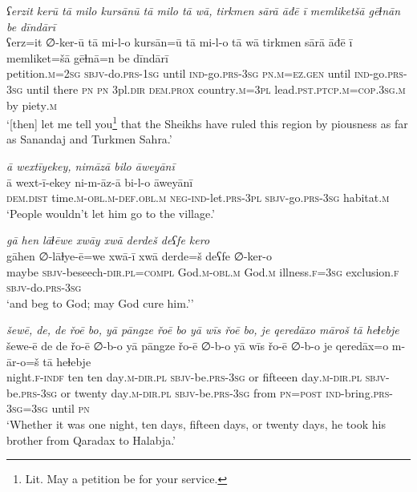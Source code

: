 \ea \label{DG.10}
\textit{ʕerzit kerū tā milo kursānū tā milo tā wā, tirkmen sārā āđē ī memliketšā gēɫnān be dīndārī} \\ 
\gll ʕerz=it ∅-ker-ū tā mi-l-o kursān=ū tā mi-l-o tā wā tirkmen sārā āđē ī memliket=šā gēɫnā=n be dīndārī \\ 
 petition\textsc{.m}\textsc{=\textsc{2sg}} \textsc{sbjv-}do\textsc{.prs}\textsc{-1sg} until \textsc{ind-}go\textsc{.prs}\textsc{-3sg} \textsc{pn}\textsc{.m}\textsc{=ez}\textsc{.gen} until \textsc{ind-}go\textsc{.prs}\textsc{-3sg} until there \textsc{pn} \textsc{pn} 3pl\textsc{.dir} \textsc{dem.prox} country\textsc{.m}\textsc{=3pl} lead\textsc{.pst}\textsc{.ptcp}\textsc{.m}\textsc{=cop}\textsc{.3sg}\textsc{.m} by piety\textsc{.m} \\ 
\glt `[then] let me tell you\footnote{Lit. May a petition be for your service.} that the Sheikhs have ruled this region by piousness as far as Sanandaj and Turkmen Sahra.'
\z 
 
\ea \label{DG.23}
\textit{ā wextīyekey, nimāzā bilo āweyānī} \\ 
\gll ā wext-ī-ekey ni-m-āz-ā bi-l-o āweyānī \\ 
 \textsc{dem.dist} time\textsc{.m}\textsc{-obl}\textsc{.m}\textsc{-def}\textsc{.obl}\textsc{.m} \textsc{neg-}\textsc{ind-}let\textsc{.prs}\textsc{-3pl} \textsc{sbjv-}go\textsc{.prs}\textsc{-3sg} habitat\textsc{\textsc{.m}} \\ 
\glt `People wouldn’t let him go to the village.'
\z 
 
\ea \label{DG.28}
\textit{gā hen lāɫēwe xwāy xwā derdeš deʕfe kero} \\ 
\gll gāhen ∅-lāɫye-ē=we xwā-ī xwā derde=š deʕfe ∅-ker-o \\ 
 maybe \textsc{sbjv-}beseech\textsc{-dir}\textsc{.pl}\textsc{=\textsc{compl}} God\textsc{.m}\textsc{-obl}\textsc{.m} God\textsc{.m} illness\textsc{\textsc{.f}}\textsc{=3sg} exclusion\textsc{\textsc{.f}} \textsc{sbjv-}do\textsc{.prs}\textsc{-3sg} \\ 
\glt `and beg to God; may God cure him.’'
\z 
 
\ea \label{DG.29}
\textit{šewē, de, de řoē bo, yā pāngze řoē bo yā wīs řoē bo, je qeredāxo māroš tā heɫebje} \\ 
\gll šewe-ē de de řo-ē ∅-b-o yā pāngze řo-ē ∅-b-o yā wīs řo-ē ∅-b-o je qeredāx=o m-ār-o=š tā heɫebje \\ 
 night\textsc{\textsc{.f}}\textsc{-indf} ten ten day\textsc{.m}\textsc{-dir}\textsc{.pl} \textsc{sbjv-}be\textsc{.prs}\textsc{-3sg} or fifteeen day\textsc{.m}\textsc{-dir}\textsc{.pl} \textsc{sbjv-}be\textsc{.prs}\textsc{-3sg} or twenty day\textsc{.m}\textsc{-dir}\textsc{.pl} \textsc{sbjv-}be\textsc{.prs}\textsc{-3sg} from \textsc{pn}\textsc{=\textsc{post}} \textsc{ind-}bring\textsc{.prs}\textsc{-3sg}\textsc{=3sg} until \textsc{pn} \\ 
\glt `Whether it was one night, ten days, fifteen days, or twenty days, he took his brother from Qaradax to Halabja.'
\z 
 
